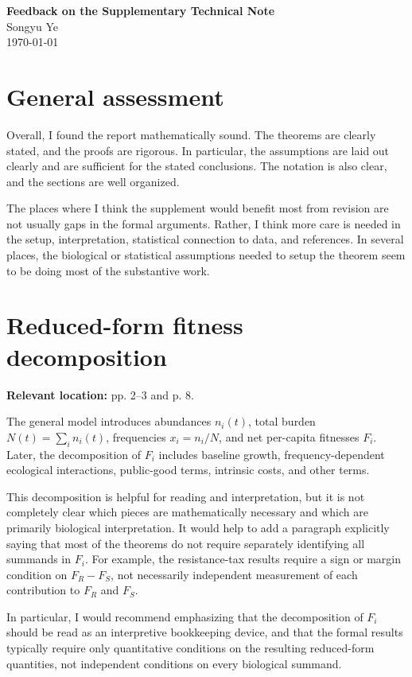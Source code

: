 \documentclass[11pt]{article}
\begin{document}
\begin{center}
    {\Large \textbf{Feedback on the Supplementary Technical Note}}\\[0.5em]
    {\normalsize Songyu Ye}\\
    {\normalsize \today}
\end{center}

\vspace{1em}

\section{General assessment}

Overall, I found the report mathematically sound. The theorems are clearly stated, and the proofs are rigorous. In particular, the assumptions are laid out clearly and are sufficient for the stated conclusions. The notation is also clear, and the sections are well organized.

The places where I think the supplement would benefit most from revision are not usually gaps in the formal arguments. Rather, I think more care is needed in the setup, interpretation, statistical connection to data, and references. In several places, the biological or statistical assumptions needed to setup the theorem seem to be doing most of the substantive work. 
\section{Reduced-form fitness decomposition}

\textbf{Relevant location:} pp. 2–3 and p. 8.

The general model introduces abundances $n_i(t)$, total burden $N(t)=\sum_i n_i(t)$, frequencies $x_i=n_i/N$, and net per-capita fitnesses $F_i$. Later, the decomposition of $F_i$ includes baseline growth, frequency-dependent ecological interactions, public-good terms, intrinsic costs, and other terms.

This decomposition is helpful for reading and interpretation, but it is not completely clear which pieces are mathematically necessary and which are primarily biological interpretation. It would help to add a paragraph explicitly saying that most of the theorems do not require separately identifying all summands in $F_i$. For example, the resistance-tax results require a sign or margin condition on $F_R-F_S$, not necessarily independent measurement of each contribution to $F_R$ and $F_S$.

In particular, I would recommend emphasizing that the decomposition of $F_i$ should be read as an interpretive bookkeeping device, and that the formal results typically require only quantitative conditions on the resulting reduced-form quantities, not independent conditions on every biological summand.
\end{document}
